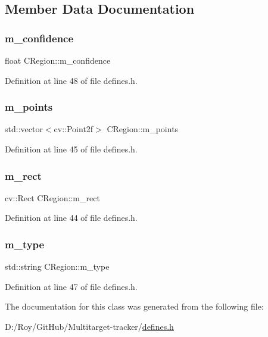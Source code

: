 \subsection{Member Data Documentation}
\mbox{\label{class_c_region_a349d846f135edc49a4c8f2db994b84b8}} 
\subsubsection{\texorpdfstring{m\+\_\+confidence}{m\_confidence}}
{\footnotesize\ttfamily float C\+Region\+::m\+\_\+confidence}



Definition at line 48 of file defines.\+h.

\mbox{\label{class_c_region_a65be08ae81a8d174d95ae35a2f7fb212}} 
\subsubsection{\texorpdfstring{m\+\_\+points}{m\_points}}
{\footnotesize\ttfamily std\+::vector$<$cv\+::\+Point2f$>$ C\+Region\+::m\+\_\+points}



Definition at line 45 of file defines.\+h.

\mbox{\label{class_c_region_a6f68304e90428db829cc38792fa3e1e8}} 
\subsubsection{\texorpdfstring{m\+\_\+rect}{m\_rect}}
{\footnotesize\ttfamily cv\+::\+Rect C\+Region\+::m\+\_\+rect}



Definition at line 44 of file defines.\+h.

\mbox{\label{class_c_region_a287bf43ffa4837595762cbb007459a9a}} 
\subsubsection{\texorpdfstring{m\+\_\+type}{m\_type}}
{\footnotesize\ttfamily std\+::string C\+Region\+::m\+\_\+type}



Definition at line 47 of file defines.\+h.



The documentation for this class was generated from the following file\+:\begin{DoxyCompactItemize}
\item 
D\+:/\+Roy/\+Git\+Hub/\+Multitarget-\/tracker/\mbox{\hyperlink{defines_8h}{defines.\+h}}\end{DoxyCompactItemize}
